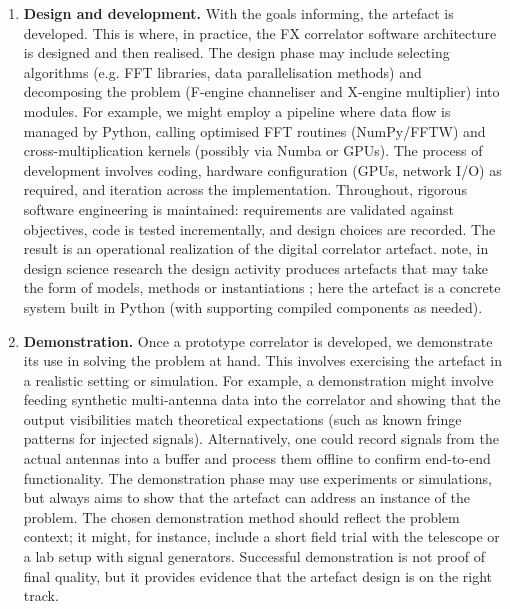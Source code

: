 \begin{enumerate}
     \item \textbf{Design and development.} With the goals informing, the artefact is developed. This is where, in practice, the FX correlator software architecture is designed and then realised. The design phase may include selecting algorithms (e.g. FFT libraries, data parallelisation methods) and decomposing the problem (F-engine channeliser and X-engine multiplier) into modules. For example, we might employ a pipeline where data flow is managed by Python, calling optimised FFT routines (NumPy/FFTW) and cross-multiplication kernels (possibly via Numba or GPUs). The process of development involves coding, hardware configuration (GPUs, network I/O) as required, and iteration across the implementation. Throughout, rigorous software engineering is maintained: requirements are validated against objectives, code is tested incrementally, and design choices are recorded. The result is an operational realization of the digital correlator artefact. \citep{Peffers2007} note, in design science research the design activity produces artefacts that may take the form of models, methods or instantiations \citep{Peffers2007}; here the artefact is a concrete system built in Python (with supporting compiled components as needed).
 
     \item \textbf{Demonstration.} Once a prototype correlator is developed, we demonstrate its use in solving the problem at hand. This involves exercising the artefact in a realistic setting or simulation. For example, a demonstration might involve feeding synthetic multi-antenna data into the correlator and showing that the output visibilities match theoretical expectations (such as known fringe patterns for injected signals). Alternatively, one could record signals from the actual antennas into a buffer and process them offline to confirm end-to-end functionality. The demonstration phase may use experiments or simulations, but always aims to show that the artefact can address an instance of the problem. The chosen demonstration method should reflect the problem context; it might, for instance, include a short field trial with the telescope or a lab setup with signal generators. Successful demonstration is not proof of final quality, but it provides evidence that the artefact design is on the right track.
 

\end{enumerate}
